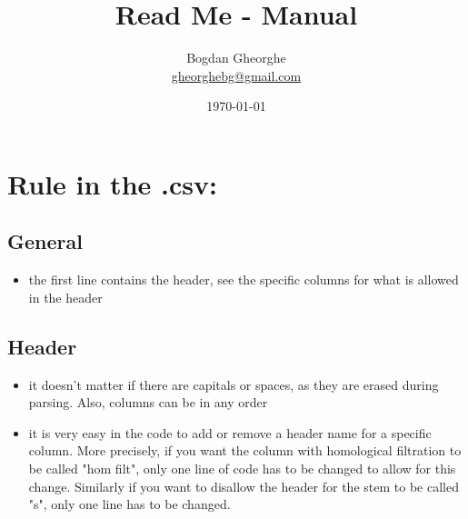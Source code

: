 \documentclass[a4paper,11pt]{article}
\title{Read Me - Manual}
\author{Bogdan Gheorghe\\ \url{gheorghebg@gmail.com}}
\date{\today}
\begin{document}
\maketitle

%
\section{Rule in the .csv:}

\subsection{General}
\begin{itemize}
	\item the first line contains the header, see the specific columns for what is allowed in the header
\end{itemize}
		
\subsection{Header}

\begin{itemize}
	\item it doesn't matter if there are capitals or spaces, as they are erased during parsing. Also, columns can be in any order
	\item it is very easy in the code to add or remove a header name for a specific column. More precisely, if you want the column with homological filtration to be called "hom filt", only one line of code has to be changed to allow for this change. Similarly if you want to disallow the header for the stem to be called "s", only one line has to be changed.

\end{itemize}
		
\end{document}
